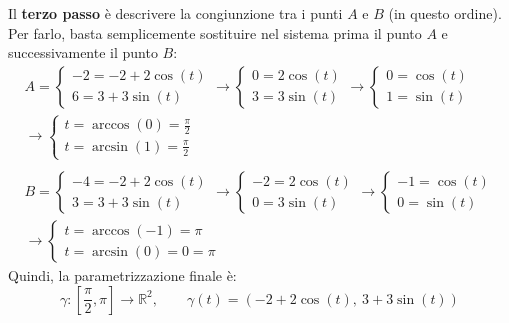 \documentclass[a4paper]{article}
\begin{document}
	\noindent
	Il \textbf{terzo passo} è descrivere la congiunzione tra i punti $A$ e $B$ (in questo ordine). Per farlo, basta semplicemente sostituire nel sistema prima il punto $A$ e successivamente il punto $B$:
	\begin{gather*}
		A = \begin{cases}
			-2 = -2 + 2 \cos\left(t\right) \\
			6 = 3 + 3 \sin\left(t\right)
		\end{cases}
		\rightarrow
		\begin{cases}
			0 = 2 \cos\left(t\right) \\
			3 = 3 \sin\left(t\right)
		\end{cases}
		\rightarrow
		\begin{cases}
			0 = \cos\left(t\right) \\
			1 = \sin\left(t\right)
		\end{cases} \\
		\rightarrow
		\begin{cases}
			t = \arccos\left(0\right) = \frac{\pi}{2} \\
			t = \arcsin\left(1\right) = \frac{\pi}{2}
		\end{cases} \\
		\\
		B = \begin{cases}
			-4 = -2 + 2 \cos\left(t\right) \\
			3 = 3 + 3 \sin\left(t\right)
		\end{cases}
		\rightarrow
		\begin{cases}
			-2 = 2 \cos\left(t\right) \\
			0 = 3 \sin\left(t\right)
		\end{cases}
		\rightarrow
		\begin{cases}
			-1 = \cos\left(t\right) \\
			0 = \sin\left(t\right)
		\end{cases} \\
		\rightarrow
		\begin{cases}
			t = \arccos\left(-1\right) = \pi \\
			t = \arcsin\left(0\right) = 0 = \pi
		\end{cases}
	\end{gather*}
	Quindi, la parametrizzazione finale è:
	\begin{equation*}
		\gamma : \left[\dfrac{\pi}{2}, \pi\right] \rightarrow \mathbb{R}^{2}, \hspace{2em} \gamma\left(t\right) = \left(-2+2\cos\left(t\right), \: 3 + 3\sin\left(t\right)\right)
	\end{equation*}
\end{document}

